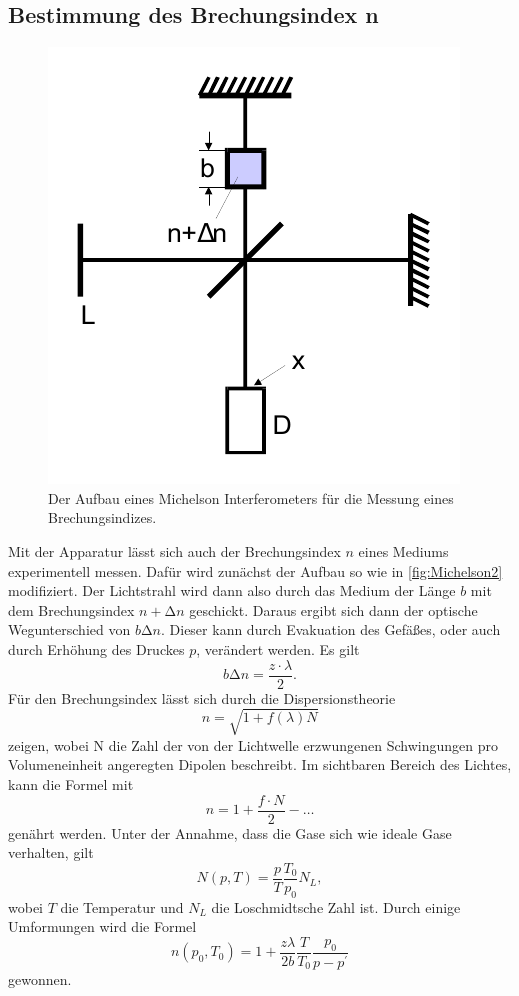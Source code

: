 \subsection{Bestimmung des Brechungsindex n}

\begin{figure}
    \centering
    \includegraphics[width=0.4 \linewidth]{pictures/Michelson2.pdf}
    \caption{Der Aufbau eines Michelson Interferometers für die Messung eines Brechungsindizes. \cite{v401}}
    \label{fig:Michelson2}
\end{figure}

Mit der Apparatur lässt sich auch der Brechungsindex $n$ eines Mediums experimentell messen.
Dafür wird zunächst der Aufbau so wie in \autoref{fig:Michelson2} modifiziert. 
Der Lichtstrahl wird dann also durch das Medium der Länge $b$ mit dem Brechungsindex $n + \increment n$ geschickt.
Daraus ergibt sich dann der optische Wegunterschied von $ b \increment n$.
Dieser kann durch Evakuation des Gefäßes, oder auch durch Erhöhung des Druckes $p$, verändert werden.
Es gilt
\begin{equation}
    b \increment n = \frac{z \cdot \lambda}{2}.
\end{equation}
Für den Brechungsindex lässt sich durch die Dispersionstheorie 
\begin{equation}
    n = \sqrt{1 + f(\lambda) N}
\end{equation}
zeigen, wobei N die Zahl der von der Lichtwelle erzwungenen Schwingungen pro Volumeneinheit angeregten Dipolen beschreibt.
Im sichtbaren Bereich des Lichtes, kann die Formel mit
\begin{equation}
    n = 1 + \frac{f \cdot N}{2} - \dots
\end{equation}
genährt werden.
Unter der Annahme, dass die Gase sich wie ideale Gase verhalten, gilt
\begin{equation*}
    N (p, T) = \frac{p}{T}\frac{T_0}{p_0} N_L ,
\end{equation*}
wobei $T$ die Temperatur und $N_L$ die Loschmidtsche Zahl ist.
Durch einige Umformungen wird die Formel
\begin{equation} \label{eq:index}
    n\left(p_{0}, T_{0}\right)=1+\frac{z \lambda}{2 b} \frac{T}{T_{0}} \frac{p_{0}}{p-p^{\prime}}
\end{equation}
gewonnen.